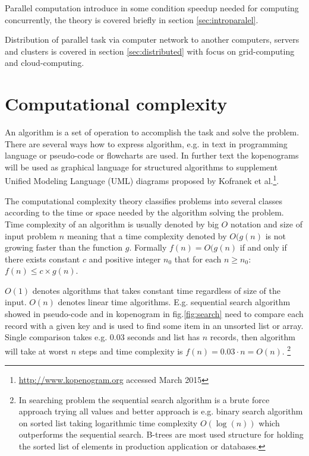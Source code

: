 Parallel computation introduce in some condition speedup needed for computing concurrently, the theory is covered briefly in section \ref{sec:introparalel}.

Distribution of parallel task via computer network to another computers, servers and clusters is covered in section \ref{sec:distributed} with focus on grid-computing and cloud-computing.

\section{Computational complexity}
\label{sec:introcomplexity}

An algorithm is a set of operation to accomplish the task and solve the problem. There are several ways how to express algorithm, e.g. in text in programming language or pseudo-code or flowcharts are used. In further text the kopenograms will be used as graphical language for structured algorithms to supplement Unified Modeling Language (UML) diagrams  proposed by Kofranek et al.\cite{Kofranek2012}\footnote{\url{http://www.kopenogram.org} accessed March 2015}.

The computational complexity theory classifies problems into several classes according to the time or space needed by the algorithm solving the problem. Time complexity of an algorithm is usually denoted by big $O$ notation and size of input problem $n$ meaning that a time complexity denoted by $O(g(n)$ is not growing faster than the function $g$. Formally $f(n)=O(g(n)$ if and only if there exists constant $c$ and positive integer $n_0$ that for each $n\geq n_0$: $f(n) \leq c \times g(n)$.

$O(1)$ denotes algorithms that takes constant time regardless of size of the input. $O(n)$ denotes linear time algorithms. E.g. sequential search algorithm showed in pseudo-code and in kopenogram in fig.\ref{fig:search} need to compare each record with a given key and is used to find some item in an unsorted list or array. Single comparison takes e.g. $0.03$ seconds and list has $n$ records, then algorithm will take at worst $n$ steps and time complexity is $f(n) = 0.03 \cdot n = O(n)$. \footnote{In searching problem the sequential search algorithm is a brute force approach trying all values and better approach is e.g. binary search algorithm on sorted list taking logarithmic time complexity $O(\log(n))$ which outperforms the sequential search. B-trees are most used structure for holding the sorted list of elements in production application or databases\cite{Bayer1972Org,Bayer1972Sym}.}

